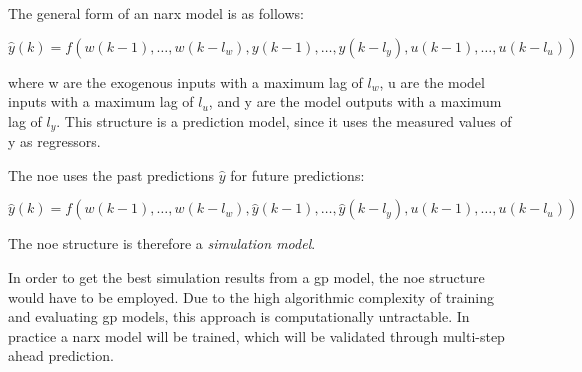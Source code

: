 The general form of an \acrfull{narx} model is as follows:

\begin{equation}
    \hat{y}(k) =
    f(w(k-1),\dots,w(k-l_w),y(k-1),\dots,y(k-l_y),u(k-1),\dots,u(k-l_u))
\end{equation}

where w are the exogenous inputs with a maximum lag of $l_w$, u are the model
inputs with a maximum lag of $l_u$, and y are the model outputs with a maximum
lag of $l_y$. This structure is a prediction model, since it uses the measured
values of y as regressors.

The \acrfull{noe} uses the past predictions $\hat{y}$ for future predictions:

\begin{equation}
    \hat{y}(k) =
    f(w(k-1),\dots,w(k-l_w),\hat{y}(k-1),\dots,\hat{y}(k-l_y),u(k-1),\dots,u(k-l_u))
\end{equation}

The \acrshort{noe} structure is therefore a \textit{simulation model}.

In order to get the best simulation results from a \acrshort{gp} model, the
\acrshort{noe} structure would have to be employed. Due to the high algorithmic
complexity of training and evaluating \acrshort{gp} models, this approach is
computationally untractable. In practice a \acrshort{narx} model will be trained,
which will be validated through multi-step ahead prediction.

\clearpage
